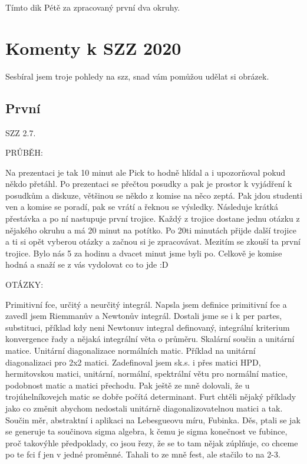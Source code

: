 \documentclass[12pt,a4paper]{article}
\begin{document}
Tímto dik Pétě za zpracovaný první dva okruhy.



\section*{Komenty k SZZ 2020}
Sesbíral jsem troje pohledy na szz, snad vám pomůžou udělat si obrázek.
\subsection*{První}
SZZ 2.7.

PRŮBĚH:

Na prezentaci je tak 10 minut ale Pick to hodně hlídal a i upozorňoval pokud někdo přetáhl. Po prezentaci se přečtou posudky a pak je prostor k vyjádření k posudkům a diskuze, většinou se někdo z komise na něco zeptá. 
Pak jdou studenti ven a komise se poradí, pak se vrátí a řeknou se výsledky. Následuje krátká přestávka a po ní nastupuje první trojice.
Každý z trojice dostane jednu otázku z nějakého okruhu a má 20 minut na potítko. Po 20ti minutách přijde další trojice a ti si opět vyberou otázky a začnou si je zpracovávat. Mezitím se zkouší ta první trojice.
Bylo nás 5 za hodinu a dvacet minut jsme byli po. Celkově je komise hodná a snaží se z vás vydolovat co to jde :D

OTÁZKY:

Primitivní fce, určitý a neurčitý integrál. Napsla jsem definice primitivní fce a zavedl jsem Riemmanův a Newtonův integrál. Dostali jsme se i k per partes, substituci, příklad kdy neni Newtonuv integral definovaný, integrální kriterium konvergence řady a nějaká integrální věta o průměru.
Skalární součin a unitární matice. Unitární diagonalizace normálních matic. Příklad na unitární diagonalizaci pro 2x2 matici. Zadefinoval jsem sk.s. i přes matici HPD, hermitovskou matici, unitární, normální, spektrální větu pro normální matice, podobnost matic a matici přechodu. Pak ještě ze mně dolovali, že u trojúhelníkovejch matic se dobře počítá determinant. Furt chtěli nějaký příklady jako co změnit abychom nedostali unitárně diagonalizovatelnou matici a tak.
Součin měr, abstraktní i aplikaci na Lebesgueovu míru, Fubinka. Děs, ptali se jak se generuje ta součinova sigma algebra, k čemu je sigma konečnost ve fubince, proč takovýhle předpoklady, co jsou řezy, že se to tam nějak zúplňuje, co chceme po te fci f jen v jedné proměnné. Tahali to ze mně fest, ale stačilo to na 2-3.
\end{document}
